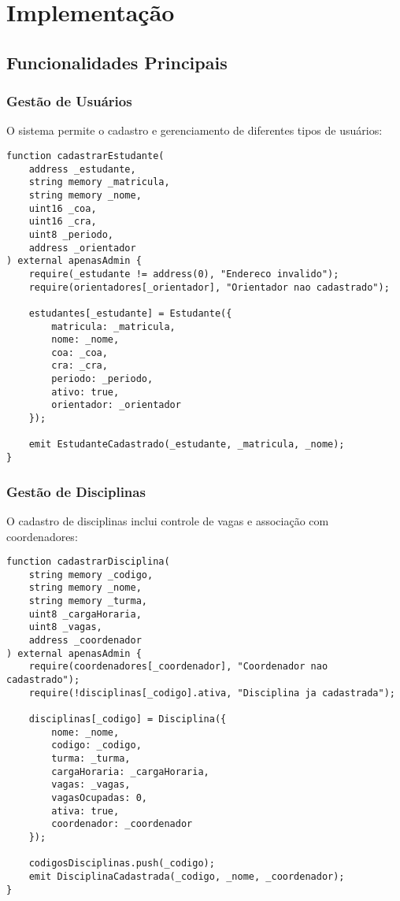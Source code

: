 \documentclass[12pt,a4paper]{article}
\begin{document}
\section{Implementação}

\subsection{Funcionalidades Principais}

\subsubsection{Gestão de Usuários}

O sistema permite o cadastro e gerenciamento de diferentes tipos de usuários:

\begin{lstlisting}[caption=Cadastro de Estudante]
function cadastrarEstudante(
    address _estudante,
    string memory _matricula,
    string memory _nome,
    uint16 _coa,
    uint16 _cra,
    uint8 _periodo,
    address _orientador
) external apenasAdmin {
    require(_estudante != address(0), "Endereco invalido");
    require(orientadores[_orientador], "Orientador nao cadastrado");
    
    estudantes[_estudante] = Estudante({
        matricula: _matricula,
        nome: _nome,
        coa: _coa,
        cra: _cra,
        periodo: _periodo,
        ativo: true,
        orientador: _orientador
    });
    
    emit EstudanteCadastrado(_estudante, _matricula, _nome);
}
\end{lstlisting}

\subsubsection{Gestão de Disciplinas}

O cadastro de disciplinas inclui controle de vagas e associação com coordenadores:

\begin{lstlisting}[caption=Cadastro de Disciplina]
function cadastrarDisciplina(
    string memory _codigo,
    string memory _nome,
    string memory _turma,
    uint8 _cargaHoraria,
    uint8 _vagas,
    address _coordenador
) external apenasAdmin {
    require(coordenadores[_coordenador], "Coordenador nao cadastrado");
    require(!disciplinas[_codigo].ativa, "Disciplina ja cadastrada");
    
    disciplinas[_codigo] = Disciplina({
        nome: _nome,
        codigo: _codigo,
        turma: _turma,
        cargaHoraria: _cargaHoraria,
        vagas: _vagas,
        vagasOcupadas: 0,
        ativa: true,
        coordenador: _coordenador
    });
    
    codigosDisciplinas.push(_codigo);
    emit DisciplinaCadastrada(_codigo, _nome, _coordenador);
}
\end{lstlisting}
\end{document}
